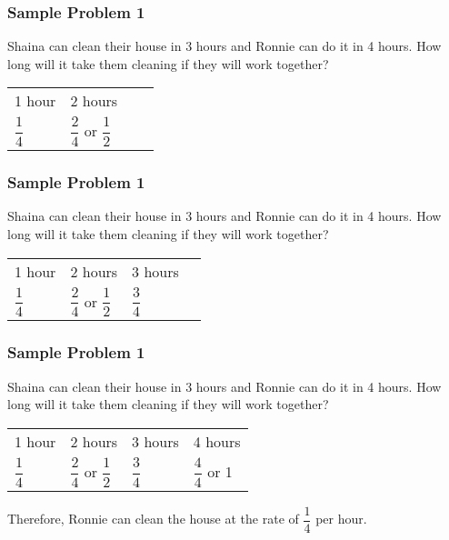 \documentclass[14pt]{beamer}
\begin{document}
    \begin{frame}
    	\frametitle{Sample Problem 1}
    	Shaina can clean their house in 3 hours and Ronnie can do it in 4 hours. How long will it take them cleaning if they will work together?    	
    	
    	\vspace{1em}
    	\begin{tabularx}{\linewidth}{ g g  e  e }
    		1 hour & 2 hours  & \phantom{3 hours} & \phantom{4 hours} \\
    		$ \dfrac{1}{4} $ & $ \dfrac{2}{4} $ or $ \dfrac{1}{2} $  &  &  \\    
    	\end{tabularx}
    \end{frame}

    \begin{frame}
    	\frametitle{Sample Problem 1}
    	Shaina can clean their house in 3 hours and Ronnie can do it in 4 hours. How long will it take them cleaning if they will work together?    	
    	
    	\vspace{1em}
    	\begin{tabularx}{\linewidth}{ g g g e }
    		1 hour & 2 hours  & 3 hours & \phantom{4 hours} \\
    		$ \dfrac{1}{4} $ & $ \dfrac{2}{4} $ or $ \dfrac{1}{2} $  & $ \dfrac{3}{4}$ &  \\    
    	\end{tabularx}
    \end{frame}

    \begin{frame}
    	\frametitle{Sample Problem 1}
    	Shaina can clean their house in 3 hours and Ronnie can do it in 4 hours. How long will it take them cleaning if they will work together?    	
    	
    	\vspace{1em}
    	\begin{tabularx}{\linewidth}{ g g g g }
    		1 hour & 2 hours  & 3 hours & 4 hours \\
    		$ \dfrac{1}{4} $ & $ \dfrac{2}{4} $ or $ \dfrac{1}{2} $  & $ \dfrac{3}{4}$ & $ \dfrac{4}{4}  $ or 1 \\    
    	\end{tabularx}
    
     \pause \vspace{1em} Therefore, Ronnie can clean the house at the rate of $ \dfrac{1}{4} $ per hour.
    \end{frame}
\end{document}
